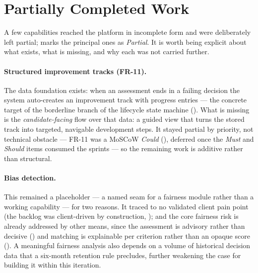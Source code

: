 
\section{Partially Completed Work}
\label{sec:concl-partial}

A few capabilities reached the platform in incomplete form and were
deliberately left partial;  marks the principal
ones as \emph{Partial}. It is worth being explicit about what exists, what is
missing, and why each was not carried further.

\paragraph{Structured improvement tracks (FR-11).}
The data foundation exists: when an assessment ends in a failing decision the
system auto-creates an improvement track with progress entries --- the
concrete target of the borderline branch of the lifecycle state machine
(). What is missing is the \emph{candidate-facing}
flow over that data: a guided view that turns the stored track into targeted,
navigable development steps. It stayed partial by priority, not technical
obstacle --- FR-11 was a MoSCoW \emph{Could} (),
deferred once the \emph{Must} and \emph{Should} items consumed the sprints ---
so the remaining work is additive rather than structural.

\paragraph{Bias detection.}
This remained a placeholder --- a named seam for a fairness module rather than
a working capability --- for two reasons. It traced to no validated client
pain point (the backlog was client-driven by construction,
); and the core fairness risk is already addressed by
other means, since the assessment is advisory rather than decisive
() and matching is explainable per criterion
rather than an opaque score (). A meaningful
fairness analysis also depends on a volume of historical decision data that a
six-month retention rule precludes, further weakening the case for building it
within this iteration.

